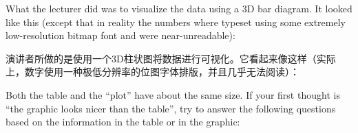 \bigskip
What the lecturer did was to visualize the data using a 3D bar diagram. It
looked like this (except that in reality the numbers where typeset using some
extremely low-resolution bitmap font and were near-unreadable):

演讲者所做的是使用一个3D柱状图将数据进行可视化。它看起来像这样（实际上，数字使用一种极低分辨率的位图字体排版，并且几乎无法阅读）：

\bigskip
\par
{}
\bigskip

Both the table and the ``plot'' have about the same size. If your first thought
is ``the graphic looks nicer than the table'', try to answer the following
questions based on the information in the table or in the graphic:

